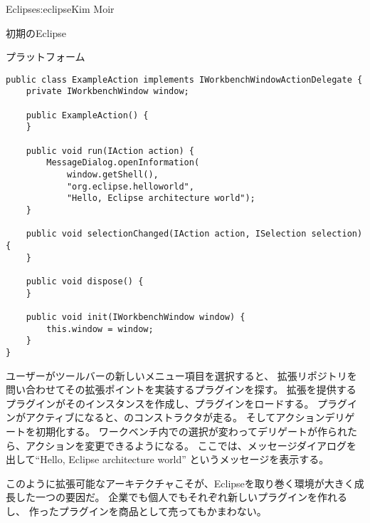 \begin{aosachapter}{Eclipse}{s:eclipse}{Kim Moir}
\begin{aosasect1}{初期のEclipse}
\begin{aosasect2}{プラットフォーム}
\begin{verbatim}
public class ExampleAction implements IWorkbenchWindowActionDelegate {
    private IWorkbenchWindow window;

    public ExampleAction() {
    }

    public void run(IAction action) {
        MessageDialog.openInformation(
            window.getShell(),
            "org.eclipse.helloworld",
            "Hello, Eclipse architecture world");
    }

    public void selectionChanged(IAction action, ISelection selection) {
    }

    public void dispose() {
    }

    public void init(IWorkbenchWindow window) {
        this.window = window;
    }
}
\end{verbatim}

ユーザーがツールバーの新しいメニュー項目を選択すると、
拡張リポジトリを問い合わせてその拡張ポイントを実装するプラグインを探す。
拡張を提供するプラグインがそのインスタンスを作成し、プラグインをロードする。
プラグインがアクティブになると、のコンストラクタが走る。
そしてアクションデリゲートを初期化する。
ワークベンチ内での選択が変わってデリゲートが作られたら、アクションを変更できるようになる。
ここでは、メッセージダイアログを出して``Hello, Eclipse architecture world''
というメッセージを表示する。

このように拡張可能なアーキテクチャこそが、Eclipseを取り巻く環境が大きく成長した一つの要因だ。
企業でも個人でもそれぞれ新しいプラグインを作れるし、
作ったプラグインを商品として売ってもかまわない。


\end{aosasect2}
\end{aosasect1}
\end{aosachapter}
